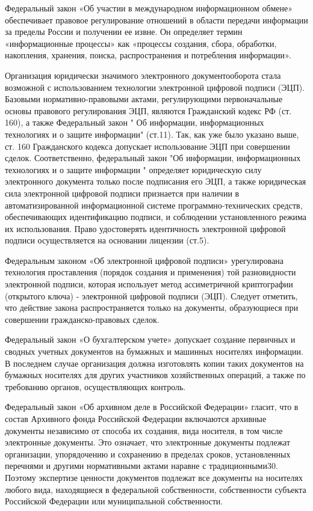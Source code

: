 Федеральный закон «Об участии в международном информационном обмене»\cite{barterlaw} обеспечивает правовое регулирование отношений в области передачи информации за пределы России и получении ее извне. Он определяет термин «информационные процессы» как «процессы создания, сбора, обработки, накопления, хранения, поиска, распространения и потребления информации».

Организация юридически значимого электронного документооборота стала возможной с использованием технологии электронной цифровой подписи (ЭЦП). Базовыми нормативно-правовыми актами, регулирующими первоначальные основы правового регулирования ЭЦП, являются Гражданский кодекс РФ (ст. 160), а также Федеральный закон " Об информации, информационных технологиях и о защите информации" (ст.11). Так, как уже было указано выше, ст. 160 Гражданского кодекса допускает использование ЭЦП при совершении сделок. Соответственно, федеральный закон "Об информации, информационных технологиях и о защите информации " определяет юридическую силу электронного документа только после подписания его ЭЦП, а также юридическая сила электронной цифровой подписи признается при наличии в автоматизированной информационной системе программно-технических средств, обеспечивающих идентификацию подписи, и соблюдении установленного режима их использования. Право удостоверять идентичность электронной цифровой подписи осуществляется на основании лицензии (ст.5).

Федеральным законом «Об электронной цифровой подписи»\cite{ecplaw} урегулирована технология проставления (порядок создания и применения) той разновидности электронной подписи, которая использует метод ассиметричной криптографии (открытого ключа) - электронной цифровой подписи (ЭЦП). Следует отметить, что действие закона распространяется только на документы, образующиеся при совершении гражданско-правовых сделок.

Федеральный закон «О бухгалтерском учете» допускает создание первичных и сводных учетных документов на бумажных и машинных носителях информации. В последнем случае организация должна изготовлять копии таких документов на бумажных носителях для других участников хозяйственных операций, а также по требованию органов, осуществляющих контроль.

Федеральный закон «Об архивном деле в Российской Федерации» гласит, что в состав Архивного фонда Российской Федерации включаются архивные документы независимо от способа их создания, вида носителя, в том числе электронные документы. Это означает, что электронные документы подлежат организации, упорядочению и сохранению в пределах сроков, установленных перечнями и другими нормативными актами наравне с традиционными30. Поэтому экспертизе ценности документов подлежат все документы на носителях любого вида, находящиеся в федеральной собственности, собственности субъекта Российской Федерации или муниципальной собственности.

